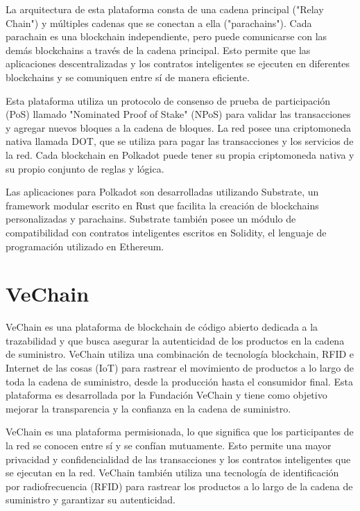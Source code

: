 \documentclass{article}
\begin{document}
La arquitectura de esta plataforma consta de una cadena principal ("Relay Chain") y múltiples cadenas que se conectan a ella ("parachains"). Cada parachain es una blockchain independiente, pero puede comunicarse con las demás blockchains a través de la cadena principal. Esto permite que las aplicaciones descentralizadas y los contratos inteligentes se ejecuten en diferentes blockchains y se comuniquen entre sí de manera eficiente. 

Esta plataforma utiliza un protocolo de consenso de prueba de participación (PoS) llamado "Nominated Proof of Stake" (NPoS) para validar las transacciones y agregar nuevos bloques a la cadena de bloques. La red posee una criptomoneda nativa llamada DOT, que se utiliza para pagar las transacciones y los servicios de la red. Cada blockchain en Polkadot puede tener su propia criptomoneda nativa y su propio conjunto de reglas y lógica.

Las aplicaciones para Polkadot son desarrolladas utilizando Substrate, un framework modular escrito en Rust que facilita la creación de blockchains personalizadas y parachains. Substrate también posee un módulo de compatibilidad con contratos inteligentes escritos en Solidity, el lenguaje de programación utilizado en Ethereum.

\section{VeChain}

VeChain es una plataforma de blockchain de código abierto dedicada a la trazabilidad y que busca asegurar la autenticidad de los productos en la cadena de suministro. VeChain utiliza una combinación de tecnología blockchain, RFID e Internet de las cosas (IoT) para rastrear el movimiento de productos a lo largo de toda la cadena de suministro, desde la producción hasta el consumidor final. Esta plataforma es desarrollada por la Fundación VeChain y tiene como objetivo mejorar la transparencia y la confianza en la cadena de suministro.

VeChain es una plataforma permisionada, lo que significa que los participantes de la red se conocen entre sí y se confían mutuamente. Esto permite una mayor privacidad y confidencialidad de las transacciones y los contratos inteligentes que se ejecutan en la red. VeChain también utiliza una tecnología de identificación por radiofrecuencia (RFID) para rastrear los productos a lo largo de la cadena de suministro y garantizar su autenticidad.
\end{document}
